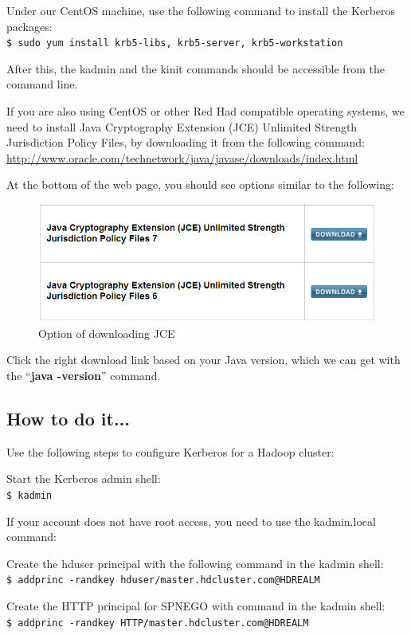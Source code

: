 Under our CentOS machine, use the following command to install the Kerberos packages: \\
\verb|$ sudo yum install krb5-libs, krb5-server, krb5-workstation|

After this, the kadmin and the kinit commands should be accessible from the command line.

If you are also using CentOS or other Red Had compatible operating systems, we need to install Java Cryptography Extension (JCE) Unlimited Strength Jurisdiction Policy Files, by downloading it from the following command: \url{http://www.oracle.com/technetwork/java/javase/downloads/index.html}

At the bottom of the web page, you should see options similar to the following:
\begin{figure}[h]
  \centering
  \includegraphics[width=\textwidth]{figs/5163os_05_01.png}
  \caption{Option of downloading JCE}\label{fig:jce}
\end{figure} 


Click the right download link based on your Java version, which we can get with the ``\textbf{java -version}'' command.
\subsection*{How to do it...}
Use the following steps to configure Kerberos for a Hadoop cluster:

Start the Kerberos admin shell: \\
\verb|$ kadmin|

If your account does not have root access, you need to use the kadmin.local command:

Create the hduser principal with the following command in the kadmin shell: \\
\verb|$ addprinc -randkey hduser/master.hdcluster.com@HDREALM|

Create the HTTP principal for SPNEGO with command in the kadmin shell: \\
\verb|$ addprinc -randkey HTTP/master.hdcluster.com@HDREALM|

